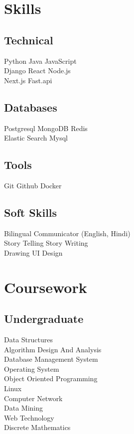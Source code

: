 \documentclass[]{deedy-resume-openfont}
\begin{document}
\begin{minipage}[t]{0.33\textwidth}

\section{Skills}
\subsection{Technical}
Python \textbullet{}   Java \textbullet{} JavaScript \\ \textbullet{} Django  \textbullet{} React \textbullet{} Node.js \\ \textbullet{} Next.js  \textbullet{} Fast.api
\subsection{Databases}
Postgresql\textbullet{}  MongoDB \textbullet{}  Redis \\
Elastic Search\textbullet{}  Mysql
\subsection{Tools}
Git\textbullet{}  Github\textbullet{}  Docker
\subsection{Soft Skills}
Bilingual Communicator (English, Hindi) \\
\textbullet{} Story Telling \textbullet{} Story Writing \\
\textbullet{} Drawing \textbullet{} UI Design
\sectionsep


\section{Coursework}
\subsection{Undergraduate}
Data Structures \\
Algorithm Design And Analysis \\
Database Management System \\
Operating System \\
Object Oriented Programming \\
Linux \\
Computer Network \\
Data Mining \\
Web Technology \\
Discrete Mathematics \\
\sectionsep


\end{minipage}
\end{document}
